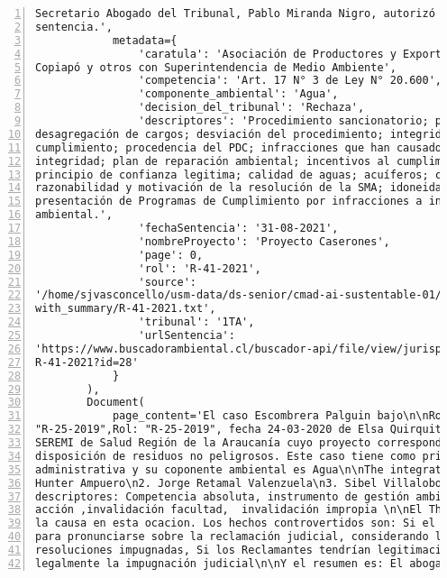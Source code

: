 \begin{Verbatim}[frame=lines, label=Elavoración propia -  Ejemplo de Contexto enviado por el Chatbot a OpenAI
				, fontsize=\scriptsize, numbers=left
				, baselinestretch=0.4
				, formatcom=\color{gray}]
Secretario Abogado del Tribunal, Pablo Miranda Nigro, autorizó la notificación de la
sentencia.',
            metadata={
                'caratula': 'Asociación de Productores y Exportadores Agrícolas del Valle de
Copiapó y otros con Superintendencia de Medio Ambiente',
                'competencia': 'Art. 17 N° 3 de Ley N° 20.600',
                'componente_ambiental': 'Agua',
                'decision_del_tribunal': 'Rechaza',
                'descriptores': 'Procedimiento sancionatorio; programa de cumplimiento; SMA;
desagregación de cargos; desviación del procedimiento; integridad del programa de
cumplimiento; procedencia del PDC; infracciones que han causado daño ambiental; criterio de
integridad; plan de reparación ambiental; incentivos al cumplimiento; falta de perjuicio;
principio de confianza legitima; calidad de aguas; acuíferos; criterio de eficacia;
razonabilidad y motivación de la resolución de la SMA; idoneidad de las medidas; Guía para la
presentación de Programas de Cumplimiento por infracciones a instrumentos de carácter
ambiental.',
                'fechaSentencia': '31-08-2021',
                'nombreProyecto': 'Proyecto Caserones',
                'page': 0,
                'rol': 'R-41-2021',
                'source':
'/home/sjvasconcello/usm-data/ds-senior/cmad-ai-sustentable-01/etl/load/../../data/clean/docs_
with_summary/R-41-2021.txt',
                'tribunal': '1TA',
                'urlSentencia':
'https://www.buscadorambiental.cl/buscador-api/file/view/jurisprudencia/S1TA Rol N°
R-41-2021?id=28'
            }
        ),
        Document(
            page_content='El caso Escombrera Palguin bajo\n\nRol: "R-25-2019", Rol:
"R-25-2019",Rol: "R-25-2019", fecha 24-03-2020 de Elsa Quirquitripay Antiman y Otros con
SEREMI de Salud Región de la Araucanía cuyo proyecto corresponde a Escombrera, sitio de
disposición de residuos no peligrosos. Este caso tiene como principal materia Invalidación
administrativa y su coponente ambiental es Agua\n\nThe integration ministers are: \n1. Iván
Hunter Ampuero\n2. Jorge Retamal Valenzuela\n3. Sibel Villalobos Volpi\n\nSiendo sus
descriptores: Competencia absoluta, instrumento de gestión ambiental, legitimación activa,
acción ,invalidación facultad,  invalidación impropia \n\nEl Third Environmental Court Rechaza
la causa en esta ocacion. Los hechos controvertidos son: Si el Tribunal tendría competencia
para pronunciarse sobre la reclamación judicial, considerando la naturaleza de las
resoluciones impugnadas, Si los Reclamantes tendrían legitimación activa para ejercer
legalmente la impugnación judicial\n\nY el resumen es: El abogado Marco Antonio Román Cordero,

\end{Verbatim}
